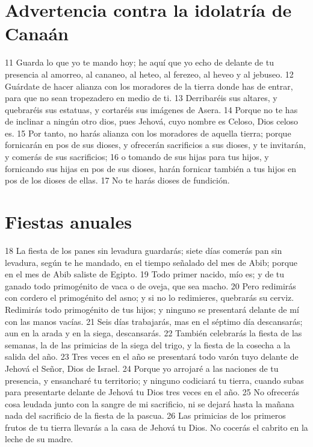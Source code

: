 \section{Advertencia contra la idolatría de Canaán}

11 Guarda lo que yo te mando hoy; he aquí que yo echo de delante de tu presencia al amorreo, al cananeo, al heteo, al ferezeo, al heveo y al jebuseo.
12 Guárdate de hacer alianza con los moradores de la tierra donde has de entrar, para que no sean tropezadero en medio de ti.
13 Derribaréis sus altares, y quebraréis sus estatuas, y cortaréis sus imágenes de Asera.
14 Porque no te has de inclinar a ningún otro dios, pues Jehová, cuyo nombre es Celoso, Dios celoso es.
15 Por tanto, no harás alianza con los moradores de aquella tierra; porque fornicarán en pos de sus dioses, y ofrecerán sacrificios a sus dioses, y te invitarán, y comerás de sus sacrificios;
16 o tomando de sus hijas para tus hijos, y fornicando sus hijas en pos de sus dioses, harán fornicar también a tus hijos en pos de los dioses de ellas.
17 No te harás dioses de fundición.

\section{Fiestas anuales}

18 La fiesta de los panes sin levadura guardarás; siete días comerás pan sin levadura, según te he mandado, en el tiempo señalado del mes de Abib; porque en el mes de Abib saliste de Egipto.
19 Todo primer nacido, mío es; y de tu ganado todo primogénito de vaca o de oveja, que sea macho.
20 Pero redimirás con cordero el primogénito del asno; y si no lo redimieres, quebrarás su cerviz. Redimirás todo primogénito de tus hijos; y ninguno se presentará delante de mí con las manos vacías.
21 Seis días trabajarás, mas en el séptimo día descansarás; aun en la arada y en la siega, descansarás.
22 También celebrarás la fiesta de las semanas, la de las primicias de la siega del trigo, y la fiesta de la cosecha a la salida del año.
23 Tres veces en el año se presentará todo varón tuyo delante de Jehová el Señor, Dios de Israel.
24 Porque yo arrojaré a las naciones de tu presencia, y ensancharé tu territorio; y ninguno codiciará tu tierra, cuando subas para presentarte delante de Jehová tu Dios tres veces en el año.
25 No ofrecerás cosa leudada junto con la sangre de mi sacrificio, ni se dejará hasta la mañana nada del sacrificio de la fiesta de la pascua.
26 Las primicias de los primeros frutos de tu tierra llevarás a la casa de Jehová tu Dios. No cocerás el cabrito en la leche de su madre.

